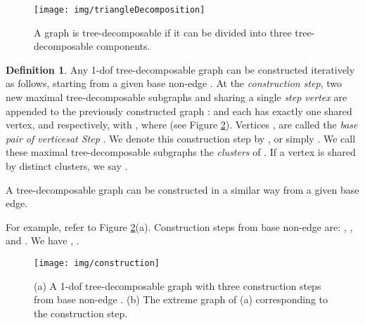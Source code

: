 \documentclass[secthm,amsthm,english]{article}
\theoremstyle{definition}
\newtheorem{definition}{Definition}
\theoremstyle{remark}
\begin{document}
\begin{figure}[h]
	  
	  
	   
	 
	
	\begin{centering}
	\texttt{[image: img/triangleDecomposition]} 
	\par\end{centering}
	
	\caption{A graph is tree-decomposable if it can be divided into three
	tree-decomposable components. }

\label{F:triangleDecomposition} 
\end{figure}



\begin{definition}\label{def:td-construction} 
Any 1-dof tree-decomposable graph  can be constructed iteratively as follows, starting from a given base non-edge . 
At the  {\emph{construction step}}, two new maximal tree-decomposable subgraphs
 and  sharing a single {\emph{step vertex}} 
are appended to the previously constructed graph : 
and  each has exactly one shared vertex,  and  respectively, with , 
where 
(see Figure \ref{F:construction}). 
Vertices ,  are called the {\emph{base pair of vertices}}{\emph{at Step}} . 
We denote this construction
step by , or simply .
We call these maximal tree-decomposable subgraphs  the {\emph{clusters}} of . 
If a vertex  is shared by  distinct clusters, we say {}. 

A tree-decomposable graph can be constructed in a similar way from a given base edge.
\end{definition}

For example, refer to Figure \ref{F:construction}(a). Construction steps
from base non-edge  are: , ,
and . 
We have , . 

\begin{figure}[h]
             
	
	\begin{centering}
	\texttt{[image: img/construction]} 
	\par\end{centering}
	
	\caption{ (a) A 1-dof tree-decomposable graph with three construction steps from base non-edge .
	(b) The extreme graph of (a) corresponding to the  construction step. 
	}

\label{F:construction} 
\end{figure}
\end{document}
